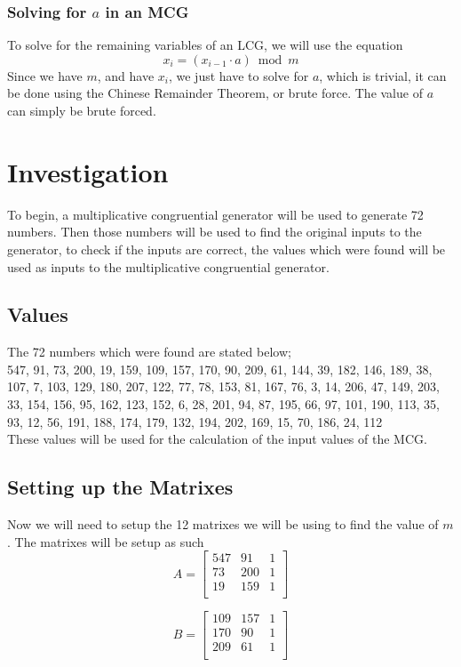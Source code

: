 \documentclass[12pft, english]{article}
\begin{document}
\begin{multicols}{2}
  \subsubsection{Solving for \(a\) in an MCG}
   To solve for the remaining variables of an LCG, we will use the equation
  \[ x_{i} = (x_{i-1} \cdot a ) \bmod m\]
  Since we have \(m\), and have \(x_{i}\), we just have to solve for \(a\), which is trivial, it can be done using the Chinese Remainder Theorem, or brute force.  The value of \(a\) can simply be brute forced.
  \section{Investigation}
  To begin, a multiplicative congruential generator will be used to generate 72 numbers. Then those numbers will be used to find the original inputs to the generator, to check if the inputs are correct, the values which were found will be used as inputs to the multiplicative congruential generator.
  \subsection{Values}
  The 72 numbers which were found are stated below; \\
  547, 91, 73, 200, 19, 159, 109, 157, 170, 90, 209, 61, 144, 39, 182, 146, 189, 38, 107, 7, 103, 129, 180, 207, 122, 77, 78, 153, 81, 167, 76, 3, 14, 206, 47, 149, 203, 33, 154, 156, 95, 162, 123, 152, 6, 28, 201, 94, 87, 195, 66, 97, 101, 190, 113, 35, 93, 12, 56, 191, 188, 174, 179, 132, 194, 202, 169, 15, 70, 186, 24, 112 \\
  These values will be used for the calculation of the input values of the MCG.
  \subsection{Setting up the Matrixes}
  Now we will need to setup the 12 matrixes we will be using to find the value of \(m\). The matrixes will be setup as such
  \[
    A =
    \begin{bmatrix}
      547 & 91  & 1 \\
      73  & 200 & 1 \\
      19  & 159 & 1\\
    \end{bmatrix}
  \]

  \[
    B =
    \begin{bmatrix}
      109 & 157 & 1 \\
      170 & 90  & 1 \\
      209 & 61  & 1\\
    \end{bmatrix}
  \]



\end{multicols}
\end{document}
